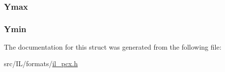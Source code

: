 \hypertarget{struct_p_c_x_h_e_a_d_a593b2ac99a0bf1170bb6074c4fefe15a}{
\subsubsection[{Ymax}]{ Ymax}}\label{struct_p_c_x_h_e_a_d_a593b2ac99a0bf1170bb6074c4fefe15a}
\hypertarget{struct_p_c_x_h_e_a_d_ac7743162b49ccdaace74fceb6e6d76f4}{
\subsubsection[{Ymin}]{ Ymin}}\label{struct_p_c_x_h_e_a_d_ac7743162b49ccdaace74fceb6e6d76f4}


The documentation for this struct was generated from the following file\-:\begin{DoxyCompactItemize}
\item 
src/\-I\-L/formats/\hyperlink{il__pcx_8h}{il\-\_\-pcx.\-h}\end{DoxyCompactItemize}
